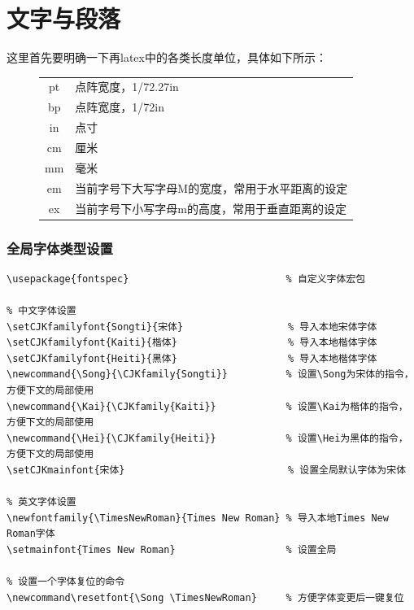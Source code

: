 \part{文字与段落}
这里首先要明确一下再latex中的各类长度单位，具体如下所示：
\begin{figure}[H]
	\centering
	\begin{tabular}{cl}
		\hline
		pt & 点阵宽度，1/72.27in \\
		bp & 点阵宽度，1/72in \\
		in & 点寸 \\
		cm & 厘米 \\
		mm & 毫米 \\
		\hline
		em & 当前字号下大写字母M的宽度，常用于水平距离的设定\\
		ex & 当前字号下小写字母m的高度，常用于垂直距离的设定\\
		\hline
	\end{tabular}
\end{figure}
\section{全局字体类型设置}
\begin{lstlisting}[style = LaTeX_TeXworks]
\usepackage{fontspec}							% 自定义字体宏包

% 中文字体设置
\setCJKfamilyfont{Songti}{宋体}				   % 导入本地宋体字体
\setCJKfamilyfont{Kaiti}{楷体}				   % 导入本地楷体字体
\setCJKfamilyfont{Heiti}{黑体}				   % 导入本地楷体字体
\newcommand{\Song}{\CJKfamily{Songti}}			% 设置\Song为宋体的指令，方便下文的局部使用	
\newcommand{\Kai}{\CJKfamily{Kaiti}}			% 设置\Kai为楷体的指令，方便下文的局部使用
\newcommand{\Hei}{\CJKfamily{Heiti}}			% 设置\Hei为黑体的指令，方便下文的局部使用
\setCJKmainfont{宋体}							   % 设置全局默认字体为宋体

% 英文字体设置
\newfontfamily{\TimesNewRoman}{Times New Roman}	% 导入本地Times New Roman字体
\setmainfont{Times New Roman}					% 设置全局

% 设置一个字体复位的命令
\newcommand\resetfont{\Song \TimesNewRoman}		% 方便字体变更后一键复位
\end{lstlisting}
